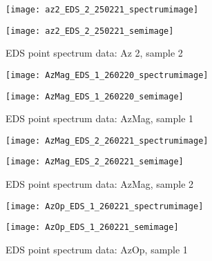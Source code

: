 \begin{figure}[H]
\centering
\begin{minipage}{.45\textwidth}
  \centering
  \texttt{[image: az2\_EDS\_2\_250221\_spectrumimage]}
\end{minipage}
\begin{minipage}{.45\textwidth}
  \centering
  \texttt{[image: az2\_EDS\_2\_250221\_semimage]}
\end{minipage}
\caption[EDS point spectrum data: Az 2, sample 2]{EDS point spectrum data: Az 2, sample 2}
\label{fig:az2_point_eds_2}
\end{figure}


\begin{figure}[H]
\centering
\begin{minipage}{.45\textwidth}
  \centering
  \texttt{[image: AzMag\_EDS\_1\_260220\_spectrumimage]}
\end{minipage}
\begin{minipage}{.45\textwidth}
  \centering
  \texttt{[image: AzMag\_EDS\_1\_260220\_semimage]}
\end{minipage}
\caption[EDS point spectrum data: AzMag, sample 1]{EDS point spectrum data: AzMag, sample 1}
\label{fig:azmag_point_eds_1}
\end{figure}

\begin{figure}[H]
\centering
\begin{minipage}{.45\textwidth}
  \centering
  \texttt{[image: AzMag\_EDS\_2\_260221\_spectrumimage]}
\end{minipage}
\begin{minipage}{.45\textwidth}
  \centering
  \texttt{[image: AzMag\_EDS\_2\_260221\_semimage]}
\end{minipage}
\caption[EDS point spectrum data: AzMag, sample 2]{EDS point spectrum data: AzMag, sample 2}
\label{fig:azmag_point_eds_2}
\end{figure}


\begin{figure}[H]
\centering
\begin{minipage}{.45\textwidth}
  \centering
  \texttt{[image: AzOp\_EDS\_1\_260221\_spectrumimage]}
\end{minipage}
\begin{minipage}{.45\textwidth}
  \centering
  \texttt{[image: AzOp\_EDS\_1\_260221\_semimage]}
\end{minipage}
\caption[EDS point spectrum data: AzOp, sample 1]{EDS point spectrum data: AzOp, sample 1}
\label{fig:azop_point_eds_1}
\end{figure}

